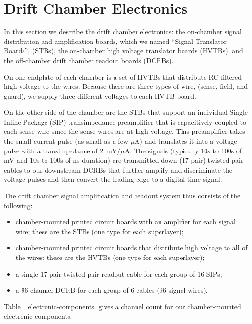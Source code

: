 \section{Drift Chamber Electronics}

In this section we describe the drift chamber electronics:
the on-chamber signal distribution and amplification boards, which
we named ``Signal Translator Boards'', (STBs),
the on-chamber high voltage translator boards (HVTBs), and the
off-chamber drift chamber readout boards (DCRBs).

On one endplate of each chamber is a set of HVTBs that distribute RC-filtered high voltage
to the wires.  Because there are three types of wire, (sense, field, and guard), we supply
three different voltages to each HVTB board.  

On the other side of the chamber are the STBs that support an individual Single Inline Package
(SIP) transimpedance preamplifier that is capacitively coupled to each sense wire since the
sense wires are at high voltage.  This preamplifier takes the
small current pulse (as small as a few $\mu$A) and translates it into a voltage 
pulse with a transimpedance of 2~mV/$\mu$A.  The signals (typically
10s to 100s of mV and 10s to 100s of ns duration) are
transmitted down (17-pair) twisted-pair cables to our downstream DCRBs that further amplify and
discriminate the voltage pulses and then convert the leading edge
to a digital time signal.

The drift chamber signal amplification and readout system thus consists of the following:
\begin{itemize}
\item  chamber-mounted printed circuit boards with an amplifier for each signal wire; 
these are the STBs (one type for each superlayer);
\item  chamber-mounted printed circuit boards that distribute high voltage
to all of the wires; these are the HVTBs (one type for each superlayer);
\item a single 17-pair twisted-pair readout cable for each group of 16
SIPs;
\item a 96-channel DCRB for each group of 6 cables (96 signal wires).
\end{itemize}

Table ~\ref{electronic-components} gives a channel count for our chamber-mounted electronic components.

